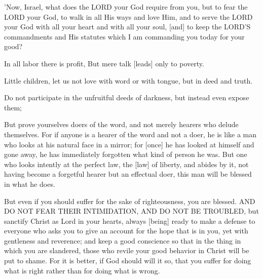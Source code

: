 \begin{scripture}[Deuteronomy 10:12-13]
    'Now, Israel, what does the LORD your God require from you, but to fear the LORD your God, to walk in all His ways and love Him, and to serve the LORD your God with all your heart and with all your soul,
    [and] to keep the LORD'S commandments and His statutes which I am commanding you today for your good?
\end{scripture}

\begin{scripture}[Proverbs 14:23]
    In all labor there is profit, But mere talk [leads] only to poverty.
\end{scripture}

\begin{scripture}[1 John 3:18]
    Little children, let us not love with word or with tongue, but in deed and truth.
\end{scripture}

\begin{scripture}[Ephesians 5:11]
    Do not participate in the unfruitful deeds of darkness, but instead even expose them;
\end{scripture}

\begin{scripture}[James 1:22-25]
    But prove yourselves doers of the word, and not merely hearers who delude themselves.
    For if anyone is a hearer of the word and not a doer, he is like a man who looks at his natural face in a mirror;
    for [once] he has looked at himself and gone away, he has immediately forgotten what kind of person he was.
    But one who looks intently at the perfect law, the [law] of liberty, and abides by it, not having become a forgetful hearer but an effectual doer, this man will be blessed in what he does.
\end{scripture}

\begin{scripture}[1 Peter 3:14-17]
    But even if you should suffer for the sake of righteousness, you are blessed. AND DO NOT FEAR THEIR INTIMIDATION, AND DO NOT BE TROUBLED,
    but sanctify Christ as Lord in your hearts, always [being] ready to make a defense to everyone who asks you to give an account for the hope that is in you, yet with gentleness and reverence;
    and keep a good conscience so that in the thing in which you are slandered, those who revile your good behavior in Christ will be put to shame.
    For it is better, if God should will it so, that you suffer for doing what is right rather than for doing what is wrong.
\end{scripture}

